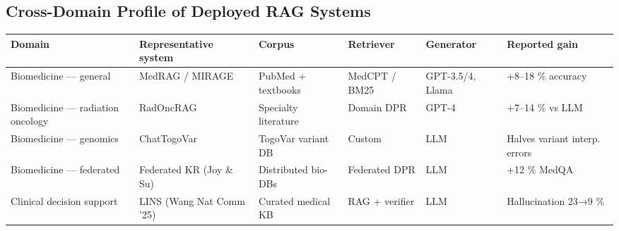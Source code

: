 \subsection{Cross-Domain Profile of Deployed RAG Systems}\label{cross-domain-profile-of-deployed-rag-systems}

{\def\LTcaptype{none} %
\begin{longtable}[]{@{}
  >{\raggedright\arraybackslash}p{}
  >{\raggedright\arraybackslash}p{}
  >{\raggedright\arraybackslash}p{}
  >{\raggedright\arraybackslash}p{}
  >{\raggedright\arraybackslash}p{}
  >{\raggedright\arraybackslash}p{}@{}}
\toprule\noalign{}
\begin{minipage}[b]{\linewidth}\raggedright
Domain
\end{minipage} & \begin{minipage}[b]{\linewidth}\raggedright
Representative system
\end{minipage} & \begin{minipage}[b]{\linewidth}\raggedright
Corpus
\end{minipage} & \begin{minipage}[b]{\linewidth}\raggedright
Retriever
\end{minipage} & \begin{minipage}[b]{\linewidth}\raggedright
Generator
\end{minipage} & \begin{minipage}[b]{\linewidth}\raggedright
Reported gain
\end{minipage} \\
\midrule\noalign{}
\endhead
\bottomrule\noalign{}
\endlastfoot
Biomedicine --- general & MedRAG / MIRAGE & PubMed + textbooks & MedCPT / BM25 & GPT-3.5/4, Llama & +8--18 \% accuracy \\
Biomedicine --- radiation oncology & RadOncRAG & Specialty literature & Domain DPR & GPT-4 & +7--14 \% vs LLM \\
Biomedicine --- genomics & ChatTogoVar & TogoVar variant DB & Custom & LLM & Halves variant interp. errors \\
Biomedicine --- federated & Federated KR (Joy \& Su) & Distributed bio-DBs & Federated DPR & LLM & +12 \% MedQA \\
Clinical decision support & LINS (Wang Nat Comm '25) & Curated medical KB & RAG + verifier & LLM & Hallucination 23→9 \% \\

\end{longtable}}

